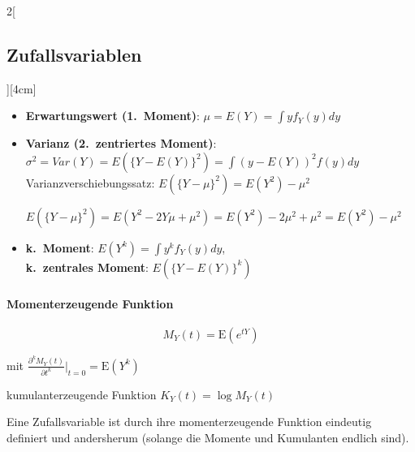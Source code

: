 \documentclass[8pt]{extarticle}
\begin{document}
\begin{multicols}{2}[\subsection{Zufallsvariablen}][4cm]
\begin{itemize}
\item \textbf{Erwartungswert (1.\ Moment)}: $\mu = E(Y) = \int y f_Y(y)dy$
\item \textbf{Varianz (2.\ zentriertes Moment)}: $\sigma^2 = Var(Y) = E(\{Y-E(Y)\}^2) = \int (y - E(Y))^2 f(y) dy$ \\
Varianzverschiebungssatz: $E(\{Y-\mu\}^2) = E(Y^2) - \mu^2$
\begin{Beweis}
$E(\{Y-\mu\}^2) = E(Y^2 - 2Y\mu + \mu^2) = E(Y^2) - 2\mu^2 + \mu^2 = E(Y^2) - \mu^2$
\end{Beweis}
\item \textbf{k.\ Moment}: $E(Y^k) = \int y^k f_Y(y) dy$,\\ \textbf{k.\ zentrales Moment}: $E(\{Y-E(Y)\}^k)$
\end{itemize}

\paragraph{Momenterzeugende Funktion}

$$M_Y(t) = \mathrm{E}(e^{tY})$$

mit $\frac{\partial^kM_Y(t)}{\partial t^k} \bigg|_{t = 0} = \mathrm{E}(Y^k)$ 

kumulanterzeugende Funktion $K_Y(t) = \log M_Y(t)$

Eine Zufallsvariable ist durch ihre momenterzeugende Funktion eindeutig definiert und andersherum (solange die Momente und Kumulanten endlich sind).
  
\end{multicols}
\end{document}
